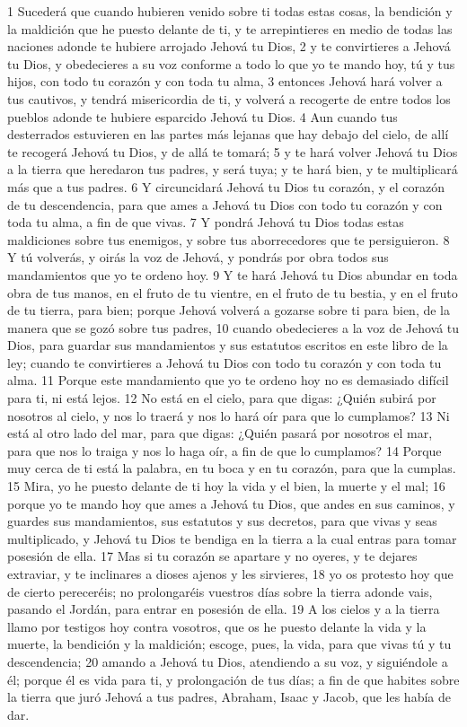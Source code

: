 1 Sucederá que cuando hubieren venido sobre ti todas estas cosas, la bendición y la maldición que he puesto delante de ti, y te arrepintieres en medio de todas las naciones adonde te hubiere arrojado Jehová tu Dios,
2 y te convirtieres a Jehová tu Dios, y obedecieres a su voz conforme a todo lo que yo te mando hoy, tú y tus hijos, con todo tu corazón y con toda tu alma,
3 entonces Jehová hará volver a tus cautivos, y tendrá misericordia de ti, y volverá a recogerte de entre todos los pueblos adonde te hubiere esparcido Jehová tu Dios.
4 Aun cuando tus desterrados estuvieren en las partes más lejanas que hay debajo del cielo, de allí te recogerá Jehová tu Dios, y de allá te tomará;
5 y te hará volver Jehová tu Dios a la tierra que heredaron tus padres, y será tuya; y te hará bien, y te multiplicará más que a tus padres.
6 Y circuncidará Jehová tu Dios tu corazón, y el corazón de tu descendencia, para que ames a Jehová tu Dios con todo tu corazón y con toda tu alma, a fin de que vivas.
7 Y pondrá Jehová tu Dios todas estas maldiciones sobre tus enemigos, y sobre tus aborrecedores que te persiguieron.
8 Y tú volverás, y oirás la voz de Jehová, y pondrás por obra todos sus mandamientos que yo te ordeno hoy.
9 Y te hará Jehová tu Dios abundar en toda obra de tus manos, en el fruto de tu vientre, en el fruto de tu bestia, y en el fruto de tu tierra, para bien; porque Jehová volverá a gozarse sobre ti para bien, de la manera que se gozó sobre tus padres,
10 cuando obedecieres a la voz de Jehová tu Dios, para guardar sus mandamientos y sus estatutos escritos en este libro de la ley; cuando te convirtieres a Jehová tu Dios con todo tu corazón y con toda tu alma.
11 Porque este mandamiento que yo te ordeno hoy no es demasiado difícil para ti, ni está lejos.
12 No está en el cielo, para que digas: ¿Quién subirá por nosotros al cielo, y nos lo traerá y nos lo hará oír para que lo cumplamos?
13 Ni está al otro lado del mar, para que digas: ¿Quién pasará por nosotros el mar, para que nos lo traiga y nos lo haga oír, a fin de que lo cumplamos?
14 Porque muy cerca de ti está la palabra, en tu boca y en tu corazón, para que la cumplas. 
15 Mira, yo he puesto delante de ti hoy la vida y el bien, la muerte y el mal;
16 porque yo te mando hoy que ames a Jehová tu Dios, que andes en sus caminos, y guardes sus mandamientos, sus estatutos y sus decretos, para que vivas y seas multiplicado, y Jehová tu Dios te bendiga en la tierra a la cual entras para tomar posesión de ella.
17 Mas si tu corazón se apartare y no oyeres, y te dejares extraviar, y te inclinares a dioses ajenos y les sirvieres,
18 yo os protesto hoy que de cierto pereceréis; no prolongaréis vuestros días sobre la tierra adonde vais, pasando el Jordán, para entrar en posesión de ella.
19 A los cielos y a la tierra llamo por testigos hoy contra vosotros, que os he puesto delante la vida y la muerte, la bendición y la maldición; escoge, pues, la vida, para que vivas tú y tu descendencia;
20 amando a Jehová tu Dios, atendiendo a su voz, y siguiéndole a él; porque él es vida para ti, y prolongación de tus días; a fin de que habites sobre la tierra que juró Jehová a tus padres, Abraham, Isaac y Jacob, que les había de dar.

